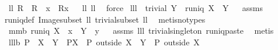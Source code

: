 \begin{isabellebody}
%
\isadelimproof
%
\endisadelimproof
\isanewline
\isanewline
{}\isamarkupfalse%
\ ll{}{}{\isacharcolon}\ {\isachardoublequoteopen}R\ {\isacharequal}\ R\ {\isacharplus}{\isacharasterisk}\ {\isacharparenleft}{\isacharbraceleft}x{\isacharbraceright}\ {\isasymtimes}\ {\isacharparenleft}R{\isacharbackquote}{\isacharbackquote}{\isacharbraceleft}x{\isacharbraceright}{\isacharparenright}{\isacharparenright}{\isachardoublequoteclose}%
\isadelimproof
\ %
\endisadelimproof
%
\isatagproof
{}\isamarkupfalse%
\ ll{}{}\ ll{}{}\ \isamarkupfalse%
\ force%
\endisatagproof
{\isafoldproof}%
%
\isadelimproof
%
\endisadelimproof
\isanewline
\isanewline
{}\isamarkupfalse%
\ lll{}{}{\isacharcolon}\ \ {\isachardoublequoteopen}trivial\ Y{\isachardoublequoteclose}\ \ {\isachardoublequoteopen}runiq\ {\isacharparenleft}X\ {\isasymtimes}\ Y{\isacharparenright}{\isachardoublequoteclose}%
\isadelimproof
\ %
\endisadelimproof
%
\isatagproof
{}\isamarkupfalse%
\ assms\ \isanewline
runiq{\isacharunderscore}def\ Image{\isacharunderscore}subset\ ll{}{}\ trivial{\isacharunderscore}subset\ ll{}{}\ \isamarkupfalse%
\ {\isacharparenleft}metis{\isacharparenleft}no{\isacharunderscore}types{\isacharparenright}{\isacharparenright}%
\endisatagproof
{\isafoldproof}%
%
\isadelimproof
%
\endisadelimproof
\isanewline
\isanewline
{}\isamarkupfalse%
\ mm{}{}b{\isacharcolon}\ {\isachardoublequoteopen}runiq\ {\isacharparenleft}{\isacharparenleft}X\ {\isasymtimes}\ {\isacharbraceleft}x{\isacharbraceright}{\isacharparenright}\ {\isacharplus}{\isacharasterisk}\ {\isacharparenleft}Y\ {\isasymtimes}\ {\isacharbraceleft}y{\isacharbraceright}{\isacharparenright}{\isacharparenright}{\isachardoublequoteclose}%
\isadelimproof
\ %
\endisadelimproof
%
\isatagproof
{}\isamarkupfalse%
\ assms\ lll{}{}\ trivial{\isacharunderscore}singleton\ runiq{\isacharunderscore}paste{}\ \isamarkupfalse%
\ metis%
\endisatagproof
{\isafoldproof}%
%
\isadelimproof
%
\endisadelimproof
\isanewline
\isanewline
{}\isamarkupfalse%
\ lll{}{}b{\isacharcolon}\ {\isachardoublequoteopen}P\ {\isacharbar}{\isacharbar}\ {\isacharparenleft}X\ {\isasyminter}\ Y{\isacharparenright}\ {\isasymsubseteq}\ P{\isacharbar}{\isacharbar}X\ {\isacharampersand}\ P\ outside\ {\isacharparenleft}X\ {\isasymunion}\ Y{\isacharparenright}\ {\isasymsubseteq}\ P\ outside\ X{\isachardoublequoteclose}%

\end{isabellebody}
